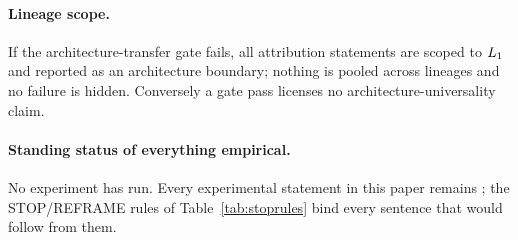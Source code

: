 \paragraph{Lineage scope.}
If the architecture-transfer gate fails, all attribution statements are
scoped to $L_{1}$ and reported as an architecture boundary; nothing is
pooled across lineages and no failure is hidden. Conversely a gate pass
licenses no architecture-universality claim.

\paragraph{Standing status of everything empirical.}
No experiment has run. Every experimental statement in this paper remains
\RESULTSPENDING{}; the STOP/REFRAME rules of Table~\ref{tab:stoprules} bind
every sentence that would follow from them.
\endgroup
\endinput
